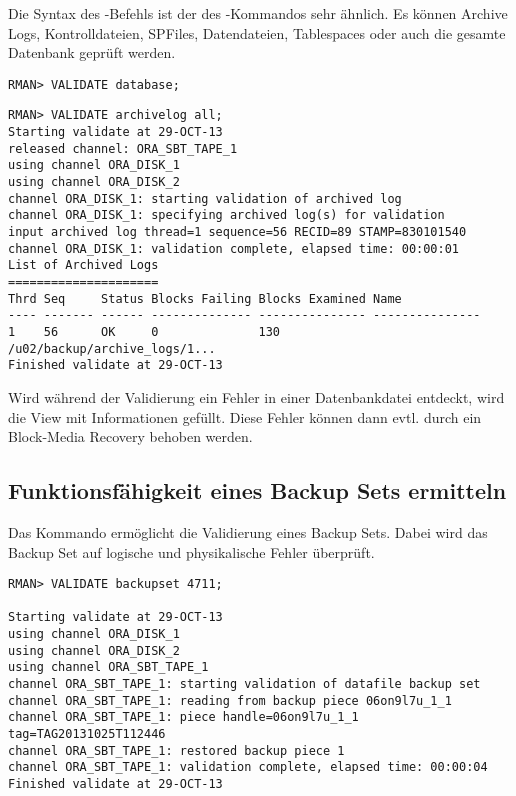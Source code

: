         Die Syntax des -Befehls ist der des -Kommandos sehr \"ahnlich. Es k\"onnen Archive Logs, Kontrolldateien, SPFiles, Datendateien, Tablespaces oder auch die gesamte Datenbank gepr\"uft werden.
\clearpage
        \begin{lstlisting}[caption={Eine ganze Datenbank validieren},label=admin1401,language=rman]
RMAN> VALIDATE database;
        \end{lstlisting}
        \begin{lstlisting}[caption={Validieren der Archive Logs},label=admin1402,language=rman]
RMAN> VALIDATE archivelog all;
Starting validate at 29-OCT-13
released channel: ORA_SBT_TAPE_1
using channel ORA_DISK_1
using channel ORA_DISK_2
channel ORA_DISK_1: starting validation of archived log
channel ORA_DISK_1: specifying archived log(s) for validation
input archived log thread=1 sequence=56 RECID=89 STAMP=830101540
channel ORA_DISK_1: validation complete, elapsed time: 00:00:01
List of Archived Logs
=====================
Thrd Seq     Status Blocks Failing Blocks Examined Name
---- ------- ------ -------------- --------------- ---------------
1    56      OK     0              130             /u02/backup/archive_logs/1...
Finished validate at 29-OCT-13
        \end{lstlisting}
        Wird w\"ahrend der Validierung ein Fehler in einer Datenbankdatei entdeckt, wird die View  mit Informationen gef\"ullt. Diese Fehler k\"onnen dann evtl. durch ein Block-Media Recovery behoben werden.
      \subsection{Funktionsf\"ahigkeit eines Backup Sets ermitteln}
        Das Kommando  erm\"oglicht die Validierung eines Backup Sets. Dabei wird das Backup Set auf logische und physikalische Fehler \"uberpr\"uft.
        \begin{lstlisting}[caption={Ein Backup Set validieren},label=admin1403,language=rman]
RMAN> VALIDATE backupset 4711;

Starting validate at 29-OCT-13
using channel ORA_DISK_1
using channel ORA_DISK_2
using channel ORA_SBT_TAPE_1
channel ORA_SBT_TAPE_1: starting validation of datafile backup set
channel ORA_SBT_TAPE_1: reading from backup piece 06on9l7u_1_1
channel ORA_SBT_TAPE_1: piece handle=06on9l7u_1_1 tag=TAG20131025T112446
channel ORA_SBT_TAPE_1: restored backup piece 1
channel ORA_SBT_TAPE_1: validation complete, elapsed time: 00:00:04
Finished validate at 29-OCT-13
        \end{lstlisting}

